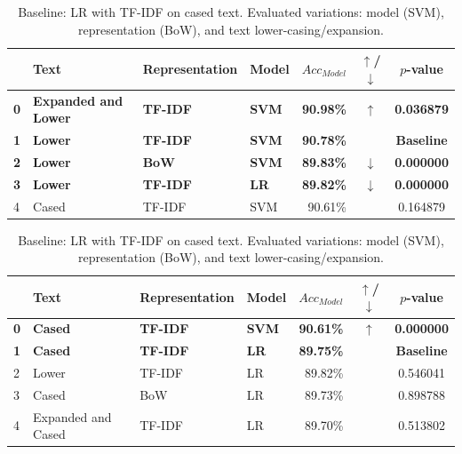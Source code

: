 \documentclass[a4paper,twoside,12pt]{book}
\newcommand{\logreg}{LR}
\newcommand{\mcnemarp}{p}
\begin{document}
\begin{table}[tbp]
	\begin{subtable}{\textwidth}
		\centering
		\caption{Baseline: SVM with TF-IDF on lowered text. Evaluated variations: model (\logreg{}), representation (BoW), and text casing/expansion.}
		\label{tab:McNemarE1b}
		\begin{tabular}{llllrcc}
			\toprule
			& Text & Representation & Model & $Acc_{Model}$ & $\uparrow$/$\downarrow$ & $\mcnemarp$-value \\
			\midrule
			\textbf{0} & \textbf{Expanded and Lower} & \textbf{TF-IDF} & \textbf{SVM} & \textbf{90.98\%} & \textbf{$\uparrow$} & \textbf{0.036879} \\
			\textbf{1} & \textbf{Lower} & \textbf{TF-IDF} & \textbf{SVM} & \textbf{90.78\%} & \textbf{} & \textbf{Baseline} \\
			\textbf{2} & \textbf{Lower} & \textbf{BoW} & \textbf{SVM} & \textbf{89.83\%} & \textbf{$\downarrow$} & \textbf{0.000000} \\
			\textbf{3} & \textbf{Lower} & \textbf{TF-IDF} & \textbf{\logreg{}} & \textbf{89.82\%} & \textbf{$\downarrow$} & \textbf{0.000000} \\
			4 & Cased & TF-IDF & SVM & 90.61\% &  & 0.164879 \\
			\bottomrule
		\end{tabular}
	\end{subtable}
	
	\vspace{0.5em}
	
	\begin{subtable}{\textwidth}
		\centering
		\caption{Baseline: \logreg{} with TF-IDF on cased text. Evaluated variations: model (SVM), representation (BoW), and text lower-casing/expansion.}
		\label{tab:McNemarE1c}
		\begin{tabular}{llllrcc}
			\toprule
			& Text & Representation & Model & $Acc_{Model}$ & $\uparrow$/$\downarrow$ & $\mcnemarp$-value \\
			\midrule
			\textbf{0} & \textbf{Cased} & \textbf{TF-IDF} & \textbf{SVM} & \textbf{90.61\%} & \textbf{$\uparrow$} & \textbf{0.000000} \\
			\textbf{1} & \textbf{Cased} & \textbf{TF-IDF} & \textbf{\logreg{}} & \textbf{89.75\%} & \textbf{} & \textbf{Baseline} \\
			2 & Lower & TF-IDF & \logreg{} & 89.82\% &  & 0.546041 \\
			3 & Cased & BoW & \logreg{} & 89.73\% &  & 0.898788 \\
			4 & Expanded and Cased & TF-IDF & \logreg{} & 89.70\% &  & 0.513802 \\
			\bottomrule
		\end{tabular}
	\end{subtable}
	

\end{table}
\end{document}
